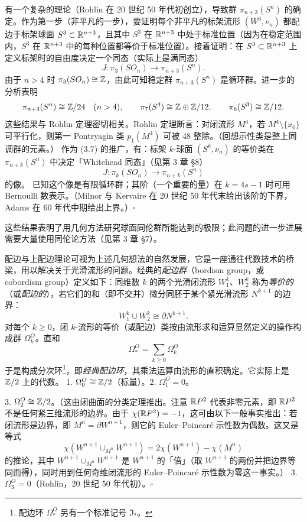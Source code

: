  有一个复杂的理论（Rohlin 在 20 世纪 50 年代初创立），导致群 $\pi_{n+3}(S^n)$ 的确定。作为第一步（非平凡的一步），要证明每个非平凡的标架流形 $(W^3,\nu_n)$ 都配边于标架球面 $S^3\subset\mathbb{R}^{n+3}$，且其中 $S^3$ 在 $\mathbb{R}^{n+3}$ 中处于标准位置（因为在稳定范围内，$S^3$ 在 $\mathbb{R}^{n+3}$ 中的每种位置都等价于标准位置）。接着证明：在 $S^3\subset\mathbb{R}^{n+3}$ 上定义标架时的自由度决定一个同态（实际上是满同态）
\begin{equation}
  J:\pi_3(SO_n)\to\pi_{n+3}(S^n). \tag{3.7}
\end{equation}
由于 $n>4$ 时 $\pi_3(SO_n)\cong\mathbb{Z}$，由此可知稳定群 $\pi_{n+3}(S^n)$ 是循环群。进一步的分析表明
\[
  \pi_{n+3}(S^n)\cong\mathbb{Z}/24\quad(n>4),\qquad
  \pi_7(S^4)\cong\mathbb{Z}\oplus\mathbb{Z}/12,\qquad
  \pi_6(S^3)\cong\mathbb{Z}/12.
\]
这些结果与 Rohlin 定理密切相关。Rohlin 定理断言：对闭流形 $M^4$，若 $M^4\setminus\{x_0\}$ 可平行化，则第一 Pontryagin 类 $p_1(M^4)$ 可被 $48$ 整除。（回想示性类是整上同调群的元素。）
作为 (3.7) 的推广，有：标架 $k$-球面 $(S^k,\nu_n)$ 的等价类在 $\pi_{n+k}(S^n)$ 中决定「Whitehead 同态」（见第 3 章 \S8）
\[
  J:\pi_k(SO_n)\to\pi_{n+k}(S^n)
\]
的像。
已知这个像是有限循环群；其阶（一个重要的量）在 $k=4s-1$ 时可用 Bernoulli 数表示。（Milnor 与 Kervaire 在 20 世纪 50 年代末给出该阶的下界，Adams 在 60 年代中期给出上界。）\hfill$\square$

这些结果表明了用几何方法研究球面同伦群所能达到的极限；此问题的进一步进展需要大量使用同伦论方法（见第 3 章 \S7）。

配边与上配边理论可视为上述几何想法的自然发展，它是一座通往代数技术的桥梁，用以解决关于光滑流形的问题。经典的\emph{配边群}（bordism group，或 cobordism group）定义如下：同维数 $k$ 的两个光滑闭流形 $W^k_1$、$W^k_2$ 称为\emph{等价的}（或\emph{配边的}），若它们的和（即不交并）微分同胚于某个紧光滑流形 $N^{k+1}$ 的边界：
\[
  W^k_1\cup W^k_2\cong\partial N^{k+1}.
\]
对每个 $k\ge0$，闭 $k$-流形的等价（或配边）类按由流形求和运算显然定义的操作构成群 $\Omega^O_k$。直和
\begin{equation}
  \Omega^O_*=\sum_{k\ge0}\Omega^O_k \tag{3.8}
\end{equation}
于是构成分次环\footnote{配边环 $\Omega^O_*$ 另有一个标准记号 $\Im_*$。}，即\emph{经典配边环}，其乘法运算由流形的直积确定。它实际上是 $\mathbb{Z}/2$ 上的代数。
 1. $\Omega^O_0\cong\mathbb{Z}/2$（标量）。2. $\Omega^O_1=0$。

3. $\Omega^O_2\cong\mathbb{Z}/2$。（这由闭曲面的分类定理推出。注意 $\mathbb{R}P^2$ 代表非零元素，即 $\mathbb{R}P^2$ 不是任何紧三维流形的边界。由于 $\chi(\mathbb{R}P^2)=-1$，这可由以下一般事实推出：若闭流形是边界，即 $M^n=\partial W^{n+1}$，则它的 Euler--Poincaré 示性数为偶数。这又是等式
\[
  \chi(W^{n+1}\cup_{M^n}W^{n+1})=2\chi(W^{n+1})-\chi(M^n)
\]
的推论，其中 $W^{n+1}\cup_{M^n}W^{n+1}$ 是 $W^{n+1}$ 的「倍」（取 $W^{n+1}$ 的两份并把边界等同而得），同时用到任何奇维闭流形的 Euler--Poincaré 示性数为零这一事实。）
3. $\Omega^O_3=0$（Rohlin，20 世纪 50 年代初）。\hfill$\square$

